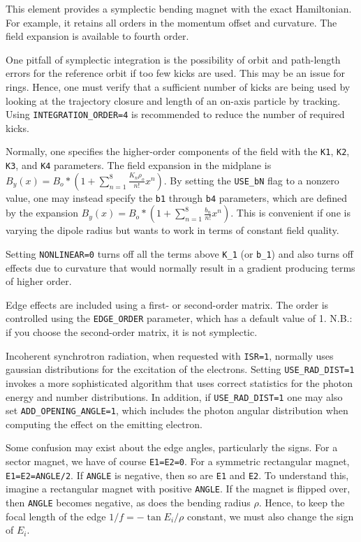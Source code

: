 This element provides a symplectic bending magnet with the exact
Hamiltonian.  For example, it retains all orders in the momentum offset
and curvature.  The field expansion is available to fourth order.

One pitfall of symplectic integration is the possibility of orbit and
path-length errors for the reference orbit if too few kicks are used.
This may be an issue for rings.  Hence, one must verify that a
sufficient number of kicks are being used by looking at the trajectory
closure and length of an on-axis particle by tracking.  Using 
{\tt INTEGRATION\_ORDER=4} is recommended to reduce the number of
required kicks.

Normally, one specifies the higher-order components of the field with
the {\tt K1}, {\tt K2}, {\tt K3}, and {\tt K4} parameters. The field
expansion in the midplane is $B_y(x) = B_o * (1 +
\sum_{n=1}^8\frac{K_n\rho_o}{n!}x^n)$.  By setting the {\tt USE\_bN}
flag to a nonzero value, one may instead specify the {\tt b1} through
{\tt b4} parameters, which are defined by the expansion $B_y(x) = B_o
* (1 + \sum_{n=1}^8\frac{b_n}{n!}x^n)$.  This is convenient if one is
varying the dipole radius but wants to work in terms of constant field
quality.  

Setting {\tt NONLINEAR=0} turns off all the terms above {\tt K\_1} (or {\tt b\_1}) and
also turns off effects due to curvature that would
normally result in a gradient producing terms of higher order.

Edge effects are included using a first- or second-order matrix.  The
order is controlled using the {\tt EDGE\_ORDER} parameter, which has a
default value of 1.  N.B.: if you choose the second-order matrix, it
is not symplectic.

Incoherent synchrotron radiation, when requested with {\tt ISR=1},
normally uses gaussian distributions for the excitation of the electrons.
Setting {\tt USE\_RAD\_DIST=1} invokes a more sophisticated algorithm that
uses correct statistics for the photon energy and number distributions.
In addition, if {\tt USE\_RAD\_DIST=1} one may also set {\tt ADD\_OPENING\_ANGLE=1},
which includes the photon angular distribution when computing the effect on 
the emitting electron.  

Some confusion may exist about the edge angles, particularly the signs.
For a sector magnet, we have of course \verb|E1=E2=0|.  For a symmetric rectangular
magnet, \verb|E1=E2=ANGLE/2|.  If \verb|ANGLE| is negative, then so are
\verb|E1| and \verb|E2|.  To understand this, imagine a rectangular magnet with positive \verb|ANGLE|.
If the magnet is flipped over, then \verb|ANGLE| becomes negative, as does the bending
radius $\rho$.    Hence, to keep the focal length
of the edge $1/f = -\tan E_i /\rho$ constant, we must also change the sign of
$E_i$.

